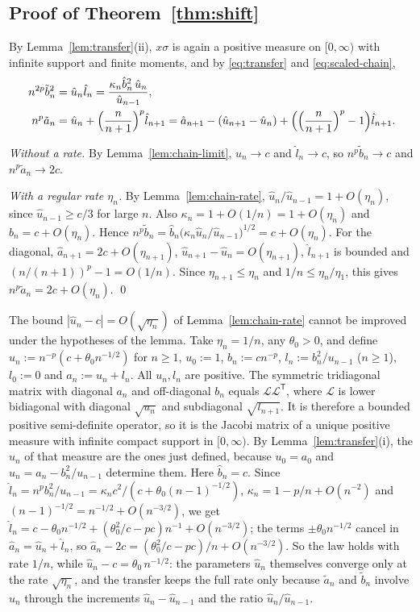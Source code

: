 \subsection{Proof of Theorem~\ref{thm:shift}}

By Lemma~\ref{lem:transfer}(ii), $x\sigma$ is again a positive measure on $[0,\infty)$ with infinite support and finite
moments, and by \eqref{eq:transfer} and \eqref{eq:scaled-chain},
\begin{align*}
  n^{2p}\tilde b_n^2&=\hat u_n\hat l_n=\frac{\kappa_n\hat b_n^2\,\hat u_n}{\hat u_{n-1}},\\
  n^p\tilde a_n&=\hat u_n+\Bigl(\frac n{n+1}\Bigr)^p\hat l_{n+1}
  =\hat a_{n+1}-(\hat u_{n+1}-\hat u_n)+\Bigl(\Bigl(\frac n{n+1}\Bigr)^p-1\Bigr)\hat l_{n+1}.
\end{align*}

\emph{Without a rate.} By Lemma~\ref{lem:chain-limit}, $\hat u_n\to c$ and $\hat l_n\to c$, so $n^p\tilde b_n\to c$ and
$n^p\tilde a_n\to2c$.

\emph{With a regular rate $\eta_n$.} By Lemma~\ref{lem:chain-rate}, $\hat u_n/\hat u_{n-1}=1+O(\eta_n)$, since
$\hat u_{n-1}\ge c/3$ for large $n$. Also $\kappa_n=1+O(1/n)=1+O(\eta_n)$ and $\hat b_n=c+O(\eta_n)$. Hence
$n^p\tilde b_n=\hat b_n\bigl(\kappa_n\hat u_n/\hat u_{n-1}\bigr)^{1/2}=c+O(\eta_n)$. For the diagonal, $\hat
a_{n+1}=2c+O(\eta_{n+1})$, $\hat u_{n+1}-\hat u_n=O(\eta_{n+1})$, $\hat l_{n+1}$ is bounded and
$(n/(n+1))^p-1=O(1/n)$. Since $\eta_{n+1}\le\eta_n$ and $1/n\le\eta_n/\eta_1$, this gives $n^p\tilde a_n=2c+O(\eta_n)$.
\qed

\begin{remark}\label{rem:sharp}
The bound $|\hat u_n-c|=O(\sqrt{\eta_n})$ of Lemma~\ref{lem:chain-rate} cannot be improved under the hypotheses of the
lemma. Take $\eta_n=1/n$, any $\theta_0>0$, and define $u_n:=n^{-p}(c+\theta_0 n^{-1/2})$ for $n\ge1$, $u_0:=1$, $b_n:=cn^{-p}$, $l_n:=b_n^2/u_{n-1}$
($n\ge1$), $l_0:=0$ and $a_n:=u_n+l_n$. All $u_n,l_n$ are positive. The symmetric tridiagonal matrix with diagonal $a_n$ and
off-diagonal $b_n$ equals $\mathcal L\mathcal L^{\mathsf T}$, where $\mathcal L$ is lower bidiagonal with diagonal
$\sqrt{u_n}$ and subdiagonal $\sqrt{l_{n+1}}$. It is therefore a bounded positive semi-definite operator, so it is the
Jacobi matrix of a unique positive measure with infinite compact support in $[0,\infty)$. By Lemma~\ref{lem:transfer}(i),
the $u_n$ of that measure are the ones just defined, because $u_0=a_0$ and $u_n=a_n-b_n^2/u_{n-1}$ determine them.
Here $\hat b_n=c$. Since $\hat l_n=n^pb_n^2/u_{n-1}=\kappa_nc^2/(c+\theta_0(n-1)^{-1/2})$, $\kappa_n=1-p/n+O(n^{-2})$
and $(n-1)^{-1/2}=n^{-1/2}+O(n^{-3/2})$, we get $\hat l_n=c-\theta_0n^{-1/2}+(\theta_0^2/c-pc)n^{-1}+O(n^{-3/2})$; the
terms $\pm\theta_0n^{-1/2}$ cancel in $\hat a_n=\hat u_n+\hat l_n$, so $\hat a_n-2c=(\theta_0^2/c-pc)/n+O(n^{-3/2})$.
So the law holds with rate $1/n$, while
$\hat u_n-c=\theta_0\,n^{-1/2}$: the parameters $\hat u_n$ themselves converge only at the rate $\sqrt{\eta_n}$, and the
transfer keeps the full rate only because $\tilde a_n$ and $\tilde b_n$ involve $\hat u_n$ through the increments
$\hat u_n-\hat u_{n-1}$ and the ratio $\hat u_n/\hat u_{n-1}$.
\end{remark}


